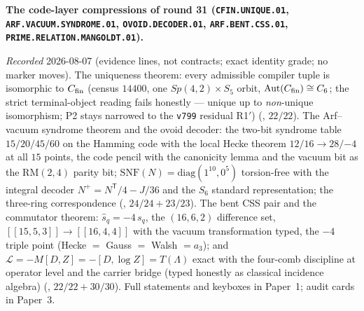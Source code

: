 \par\smallskip\noindent\textbf{The code-layer compressions of
round 31 (\texttt{CFIN.UNIQUE.01},
\texttt{ARF.VACUUM.SYNDROME.01}, \texttt{OVOID.DECODER.01},
\texttt{ARF.BENT.CSS.01}, \texttt{PRIME.RELATION.MANGOLDT.01}).}
{\sloppy
\emph{Recorded} 2026-08-07 (evidence lines, not contracts; exact
identity grade; no marker moves).  The uniqueness theorem: every
admissible compiler tuple is isomorphic to $C_{\rm fin}$ (census
$14400$, one $Sp(4,2)\times S_5$ orbit,
$\mathrm{Aut}(C_{\rm fin}) \cong C_6$; the strict
terminal-object reading fails honestly --- unique up to
\emph{non}-unique isomorphism; P2 stays narrowed to the
\texttt{v799} residual R1$'$)
(, $22/22$).  The
Arf--vacuum syndrome theorem and the ovoid decoder: the two-bit
syndrome table $15/20/45/60$ on the Hamming code with the local
Hecke theorem $12/16 \to 28/{-4}$ at all $15$ points, the code
pencil with the canonicity lemma and the vacuum bit as the
$\mathrm{RM}(2,4)$ parity bit; $\mathrm{SNF}(N) =
\mathrm{diag}(1^{10}, 0^5)$ torsion-free with the integral
decoder $N^{+} = N^{\mathsf T}/4 - J/36$ and the $S_6$ standard
representation; the three-ring correspondence
(, $24/24 + 23/23$).  The bent
CSS pair and the commutator theorem: $\hat s_q = -4\,s_q$, the
$(16,6,2)$ difference set, $[[15,5,3]] \to [[16,4,4]]$ with the
vacuum transformation typed, the $-4$ triple point (Hecke $=$
Gauss $=$ Walsh $= a_3$); and $\mathcal L = -M[D,Z] = -[D, \log
Z] = T(\Lambda)$ exact with the four-comb discipline at operator
level and the carrier bridge (typed honestly as classical
incidence algebra)
(, $22/22 + 30/30$).  Full
statements and keyboxes in Paper~1; audit cards in Paper~3.\par}


